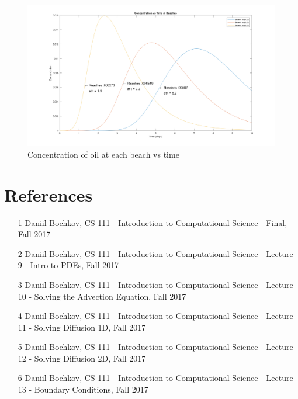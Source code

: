 \documentclass[12pt]{article}
\begin{document}
\begin{figure}[htb]
\begin{adjustwidth}{-2cm}{-2cm}
\centering
\hspace{-.9cm}\includegraphics[width=1.2\textwidth]{Problem2_fig4.png}
\caption*{Concentration of oil at each beach vs time}
\label{fig::p2_fig5}
\end{adjustwidth}
\end{figure}


\newpage
\clearpage
\setcounter{page}{1} \pagestyle{empty}
\section*{References}\label{sec::References}
\begin{itemize}
\item [1] Daniil Bochkov, CS 111 - Introduction to Computational Science - Final, Fall 2017
\item [2] Daniil Bochkov, CS 111 - Introduction to Computational Science - Lecture 9 - Intro to PDEs, Fall 2017
\item [3] Daniil Bochkov, CS 111 - Introduction to Computational Science - Lecture 10 - Solving the Advection Equation,  Fall 2017
\item [4] Daniil Bochkov, CS 111 - Introduction to Computational Science - Lecture 11 - Solving Diffusion 1D, Fall 2017
\item [5] Daniil Bochkov, CS 111 - Introduction to Computational Science - Lecture 12 - Solving Diffusion 2D, Fall 2017
\item [6] Daniil Bochkov, CS 111 - Introduction to Computational Science - Lecture 13 - Boundary Conditions, Fall 2017
\end{itemize}
\end{document}
